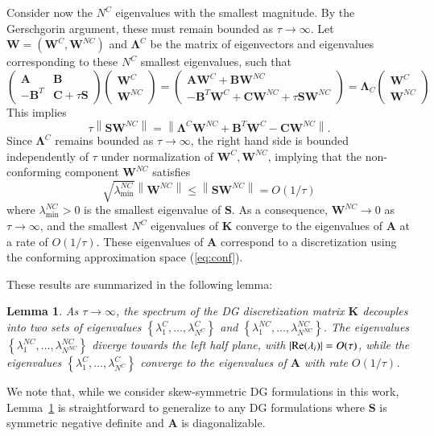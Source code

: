 \documentclass[preprint,10pt]{elsarticle}
\newcommand{\nor}[1]{\left\| #1 \right\|}
\newcommand{\LRb}[1]{\left| #1 \right|}
\newcommand{\LRc}[1]{\left\{ #1 \right\}}
\newtheorem{lemma}[theorem]{Lemma}
\begin{document}
Consider now the $N^C$ eigenvalues with the smallest magnitude.  By the Gerschgorin argument, these must remain bounded as $\tau \rightarrow \infty$.  Let $\bm{W} = (\bm{W}^C,\bm{W}^{NC})$ and $\bm{\Lambda}^C$ be the matrix of eigenvectors and eigenvalues corresponding to these $N^C$ smallest eigenvalues, such that
\[
\left(\begin{array}{cc}
\bm{A} & \bm{B}\\
-\bm{B}^T & \bm{C} + \tau \bm{S}
\end{array}\right)
\left(\begin{array}{c}
\bm{W}^C
\\
\bm{W}^{NC}
\end{array}\right) = 
\left(\begin{array}{c}
\bm{A}\bm{W}^C + \bm{B}\bm{W}^{NC}\\
-\bm{B}^T\bm{W}^C + \bm{C}\bm{W}^{NC} + \tau \bm{S}\bm{W}^{NC}
\end{array}\right)
= 
\bm{\Lambda}_C
\left(\begin{array}{c}
\bm{W}^C
\\
\bm{W}^{NC}
\end{array}\right) 
\]
This implies 
\[
\tau \nor{\bm{S}\bm{W}^{NC}} = \nor{\bm{\Lambda}^C \bm{W}^{NC} + \bm{B}^T\bm{W}^C  - \bm{C}\bm{W}^{NC}}.
\]
Since $\bm{\Lambda}^C$ remains bounded as $\tau\rightarrow \infty$, the right hand side is bounded independently of $\tau$ under normalization of $\bm{W}^C,\bm{W}^{NC}$, implying that the non-conforming component $\bm{W}^{NC}$ satisfies
\[
\sqrt{\lambda^{NC}_{\min}}\nor{\bm{W}^{NC}} \leq \nor{\bm{S}\bm{W}^{NC}} = O(1/\tau)
\]
where $\lambda^{NC}_{\min} > 0$ is the smallest eigenvalue of $\bm{S}$.  As a consequence, $\bm{W}^{NC} \rightarrow 0$ as $\tau\rightarrow \infty$, and the smallest $N^C$ eigenvalues of $\bm{K}$ converge to the eigenvalues of $\bm{A}$ at a rate of $O(1/\tau)$.  These eigenvalues of $\bm{A}$ correspond to a discretization using the conforming approximation space (\ref{eq:conf}). 

These results are summarized in the following lemma:
\begin{lemma}
As $\tau \rightarrow \infty$, the spectrum of the DG discretization matrix $\bm{K}$ decouples into two sets of eigenvalues $\LRc{\lambda^C_1,\ldots,\lambda^C_{N^C}}$ and $\LRc{\lambda^{NC}_1,\ldots,\lambda^{NC}_{N^{NC}}}$.  The eigenvalues $\LRc{\lambda^{NC}_1,\ldots,\lambda^{NC}_{N^{NC}}}$ diverge towards the left half plane, with $\LRb{{\rm Re}(\lambda_i)} = O(\tau)$, while  the eigenvalues $\LRc{\lambda^C_1,\ldots,\lambda^C_{N^C}}$ converge to the eigenvalues of $\bm{A}$ with rate $O(1/\tau)$.  
\label{lemma:eig}
\end{lemma}
We note that, while we consider skew-symmetric DG formulations in this work, Lemma~\ref{lemma:eig} is straightforward to generalize to any DG formulations where $\bm{S}$ is symmetric negative definite and $\bm{A}$ is diagonalizable.  
\end{document}
